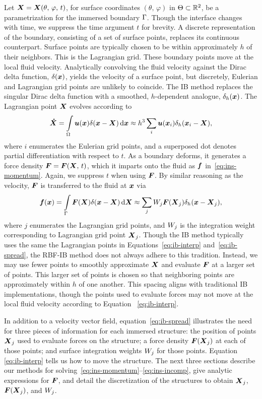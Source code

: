 Let $\boldsymbol{X} = \boldsymbol{X}(\theta,\,\varphi,\,t)$, for surface coordinates $(\theta,\,\varphi)$ in
$\Theta\subset\mathbb{R}^2$, be a parametrization for the immersed boundary $\Gamma$.
Though the interface changes with time, we suppress the time argument $t$ for brevity. A
discrete representation of the boundary, consisting of a set of surface points, replaces
its continuous counterpart.  Surface points are typically chosen to be within
approximately $h$ of their neighbors.  This is the Lagrangian grid. These boundary points
move at the local fluid velocity.  Analytically convolving the fluid velocity against the
Dirac delta function, $\delta(\boldsymbol{x})$, yields the velocity of a surface point, but
discretely, Eulerian and Lagrangian grid points are unlikely to coincide. The IB method
replaces the singular Dirac delta function with a smoothed, $h$-dependent analogue,
$\delta_h(\boldsymbol{x})$. The Lagrangian point $\boldsymbol{X}$ evolves according to
\begin{equation}\label{eq:ib-interp}
    \vec{\dot{X}}
        = \int\limits_{\domain} \u(\x) \Dirac(\x-\X) \d\x
        \approx h^3 \sum_{i} \u(\x_i) \Dirac_h(\x_i-\X),
\end{equation}
where $i$ enumerates the Eulerian grid points, and a superposed dot denotes partial
differentiation with respect to $t$. As a boundary deforms, it generates a force density
$\boldsymbol{F} = \boldsymbol{F}(\boldsymbol{X},\,t)$, which it imparts onto the fluid as $\boldsymbol{f}$ in~\eqref{eq:ins-momentum}.
Again, we suppress $t$ when using $\boldsymbol{F}$. By similar reasoning as the velocity, $\boldsymbol{F}$ is
transferred to the fluid at $\boldsymbol{x}$ via
\begin{equation}\label{eq:ib-spread}
        \f(\x)
        = \int\limits_{\interface} \F(\X)\Dirac(\x-\X) \d\X
        \approx \sum_{j} \weight[j]\F(\X_j) \Dirac_h(\x-\X_j),
\end{equation}
where $j$ enumerates the Lagrangian grid points, and $\weight[j]$ is the integration
weight corresponding to Lagrangian grid point $\boldsymbol{X}_j$. Though the IB method typically uses
the same the Lagrangian points in Equations~\eqref{eq:ib-interp} and~\eqref{eq:ib-spread},
the RBF-IB method does not always adhere to this tradition. Instead, we may use fewer
points to smoothly approximate $\boldsymbol{X}$ and evaluate $\boldsymbol{F}$ at a larger set of points. This
larger set of points is chosen so that neighboring points are approximately within $h$ of
one another. This spacing aligns with traditional IB implementations, though the points
used to evaluate forces may not move at the local fluid velocity according to Equation~%
\eqref{eq:ib-interp}.

In addition to a velocity vector field, equation~\eqref{eq:ib-spread} illustrates the
need for three pieces of information for each immersed structure: the position of points
$\boldsymbol{X}_j$ used to evaluate forces on the structure; a force density $\boldsymbol{F}(\boldsymbol{X}_j)$ at each of
those points; and surface integration weights $\weight[j]$ for those points. Equation~%
\eqref{eq:ib-interp} tells us how to move the structure. The next three sections describe
our methods for solving~\eqref{eq:ins-momentum}--\eqref{eq:ins-incomp}, give analytic
expressions for $\boldsymbol{F}$, and detail the discretization of the structures to obtain $\boldsymbol{X}_j$,
$\boldsymbol{F}(\boldsymbol{X}_j)$, and $\weight[j]$.
